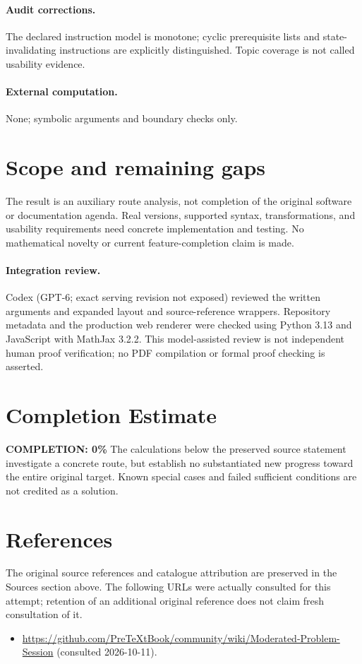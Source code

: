 \documentclass[11pt]{article}
\begin{document}
\paragraph{Audit corrections.} The declared instruction model is monotone; cyclic prerequisite lists and state-invalidating instructions are explicitly distinguished. Topic coverage is not called usability evidence.
\paragraph{External computation.} None; symbolic arguments and boundary checks only.
\section{Scope and remaining gaps}
The result is an auxiliary route analysis, not completion of the original software or documentation agenda. Real versions, supported syntax, transformations, and usability requirements need concrete implementation and testing. No mathematical novelty or current feature-completion claim is made.
\paragraph{Integration review.} Codex (GPT-6; exact serving revision not exposed) reviewed the written arguments and expanded layout and source-reference wrappers. Repository metadata and the production web renderer were checked using Python 3.13 and JavaScript with MathJax 3.2.2. This model-assisted review is not independent human proof verification; no PDF compilation or formal proof checking is asserted.

\section{Completion Estimate}
\noindent\textbf{COMPLETION: 0\%}
The calculations below the preserved source statement investigate a concrete route,
but establish no substantiated new progress toward the entire original target.
Known special cases and failed sufficient conditions are not credited as a solution.
\section{References}
The original source references and catalogue attribution are preserved in the
Sources section above. The following URLs were actually consulted for this attempt;
retention of an additional original reference does not claim fresh consultation of it.
\begin{itemize}
\item \url{https://github.com/PreTeXtBook/community/wiki/Moderated-Problem-Session} (consulted 2026-10-11). 
\end{itemize}
\end{document}
